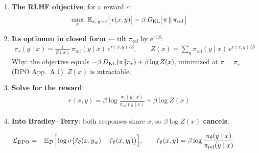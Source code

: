 \begin{enumerate}
  \item \textbf{The RLHF objective}, for a reward $r$:
  \begin{gather*}
    \max_\pi\ \mathbb{E}_{x,\,y\sim\pi}\big[r(x,y)\big] - \beta\,D_{\mathrm{KL}}\big[\pi\,\|\,\pi_{\mathrm{ref}}\big]
  \end{gather*}
  \item \textbf{Its optimum in closed form} --- tilt $\pi_{\mathrm{ref}}$ by $e^{r/\beta}$:
  \begin{gather*}
    \pi_r(y\mid x) = \frac{1}{Z(x)}\,\pi_{\mathrm{ref}}(y\mid x)\,e^{r(x,y)/\beta}, \qquad Z(x)=\textstyle\sum_y\pi_{\mathrm{ref}}(y\mid x)\,e^{r(x,y)/\beta}
  \end{gather*}
  {\small Why: the objective equals $-\beta\,D_{\mathrm{KL}}(\pi\|\pi_r)+\beta\log Z(x)$, minimized at $\pi=\pi_r$ (DPO App.~A.1). $Z(x)$ is intractable.}
  \item \textbf{Solve for the reward}:
  \begin{gather*}
    r(x,y) = \beta\log\frac{\pi_r(y\mid x)}{\pi_{\mathrm{ref}}(y\mid x)} + \beta\log Z(x)
  \end{gather*}
  \item \textbf{Into Bradley--Terry}: both responses share $x$, so $\beta\log Z(x)$ \textbf{cancels}:
\end{enumerate}

\begin{eqbox}
\begin{gather*}
  \mathcal L_{\mathrm{DPO}} = -\mathbb{E}_{\mathcal D}\Big[\log\sigma\big(\hat r_\theta(x,y_w) - \hat r_\theta(x,y_l)\big)\Big],
  \qquad \hat r_\theta(x,y) = \beta\log\frac{\pi_\theta(y\mid x)}{\pi_{\mathrm{ref}}(y\mid x)}
\end{gather*}
\end{eqbox}


